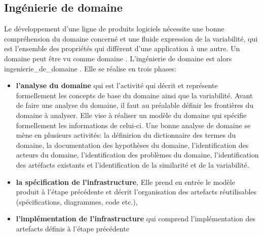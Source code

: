 \subsection{Ingénierie de domaine}
Le développement d'une ligne de produits logiciels nécessite une bonne compréhension du domaine concerné et une fluide expression de la variabilité, qui est l'ensemble des propriétés qui diffèrent d'une application à une autre. Un domaine peut être vu comme \glsdesc{domaine} \cite{Klaus2005}. L'ingénierie de domaine est alors \glsdesc{ingenierie_de_domaine} \cite{Klaus2005}. Elle se réalise en trois phases:
\begin{itemize}
	\item \textbf{l'analyse du domaine} qui est l'activité qui décrit et représente formellement les concepts de base du domaine ainsi que la variabilité. Avant de faire une analyse du domaine, il faut au préalable définir les frontières du domaine à analyser. Elle vise à réaliser un modèle du domaine qui spécifie formellement les informations de celui-ci. Une bonne analyse de domaine se mène en plusieurs activités: la définirion du dictionnaire des termes du domaine, la documentation des hypothèses du domaine, l'identification des acteurs du domaine, l'identification des problèmes du domaine, l'identification des artéfacts existants et l'identification de la similarité et de la variabilité.
	\item \textbf{la spécification de l’infrastructure}, Elle prend en entrée le modèle produit à l'étape précédente et décrit l’organisation des artefacts réutilisables (spécifications, diagrammes, code etc.),
	\item \textbf{l’implémentation de l'infrastructure} qui comprend l’implémentation des artefacts définis à l'étape précédente
\end{itemize}  
